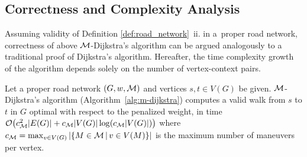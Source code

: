 \documentclass[envcountsect,envcountsame]{llncs}
\begin{document}
\subsection{Correctness and Complexity Analysis} 
\label{sec:analysis}

Assuming validity of Definition \ref{def:road_network}\, ii. in a~proper road 
network, correctness of above $\cal{M}$-Dijkstra's algorithm can be argued 
analogously to a traditional proof of Dijkstra's algorithm. Hereafter, the 
time complexity growth of the algorithm depends solely on the number of 
vertex-context pairs.

\begin{theorem}
  \label{thm:MDijkstra}
  Let a proper road network $(G,w,\cal{M})$ and vertices $s,t \in
  V(G)$ be given. ${\cal{M}}$-Dijk\-stra's algorithm (Algorithm~\ref{alg:m-dijkstra})
  computes a valid walk from $s$ to $t$ in $G$ optimal with respect to the
  penalized weight, in time ${\cal O} \big(c^2_{\cal M}|E(G)| + c_{\cal M}|V(G)|
  \log(c_{\cal M}|V(G)|) \big)$ where $c_{\cal M} =\max_{v\in V(G)}| 
  \{M\in{\cal{M}}\, |\, v\in V(M)\}|$ is the maximum number of maneuvers per 
  vertex.
\end{theorem}
\end{document}
